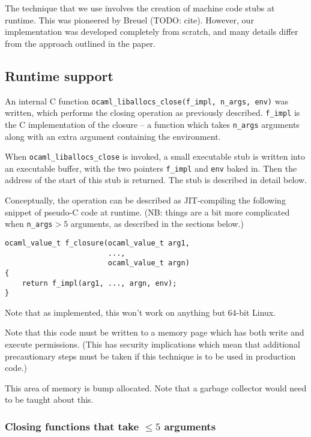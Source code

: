 \documentclass[12pt,a4paper,twoside,openright]{report}
\begin{document}
The technique that we use involves the creation of machine code stubs at
runtime. This was pioneered by Breuel (TODO: cite). However, our implementation
was developed completely from scratch, and many details differ from the
approach outlined in the paper.

\subsection{Runtime support}\label{closures-runtime-support}

An internal C function \lstinline{ocaml_liballocs_close(f_impl, n_args, env)}
was written, which performs the closing operation as previously described.
\lstinline!f_impl! is the C implementation of the closure -- a function which
takes \lstinline!n_args! arguments along with an extra argument containing the environment.

When \lstinline!ocaml_liballocs_close! is
invoked, a small executable stub is written into an executable
buffer, with the two pointers \lstinline!f_impl! and \lstinline!env! baked in.
Then the address of the start of this stub is returned. The stub is described
in detail below.

Conceptually, the operation can be described as JIT-compiling the following
snippet of pseudo-C code at runtime. (NB: things are a bit more complicated
when \lstinline!n_args!${} > 5$ arguments, as described in the sections below.)

\begin{lstlisting}
ocaml_value_t f_closure(ocaml_value_t arg1,
                        ...,
                        ocaml_value_t argn)
{
    return f_impl(arg1, ..., argn, env);
}
\end{lstlisting}

Note that as implemented, this won't work on anything but 64-bit Linux.

Note that this code must be written to a memory page which has both write and
execute permissions. (This has security implications which mean that additional
precautionary steps must be taken if this technique is to be used in production
code.)

This area of memory is bump allocated. Note that a garbage collector would need
to be taught about this.

\subsubsection{Closing functions that take $\le 5$ arguments}
\end{document}
